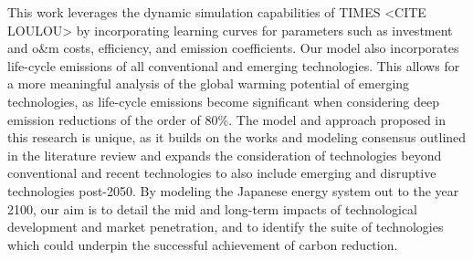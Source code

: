 This work leverages the dynamic simulation capabilities of TIMES <CITE LOULOU> by incorporating learning curves for parameters such as investment and o&m costs, efficiency, and emission coefficients. Our model also incorporates life-cycle emissions of all conventional and emerging technologies. This allows for a more meaningful analysis of the global warming potential of emerging technologies, as life-cycle emissions become significant when considering deep emission reductions of the order of 80\%. The model and approach proposed in this research is unique, as it builds on the works and modeling consensus outlined in the literature review and expands the consideration of technologies beyond conventional and recent technologies to also include emerging and disruptive technologies post-2050. By modeling the Japanese energy system out to the year 2100, our aim is to detail the mid and long-term impacts of technological development and market penetration, and to identify the suite of technologies which could underpin the successful achievement of carbon reduction.

